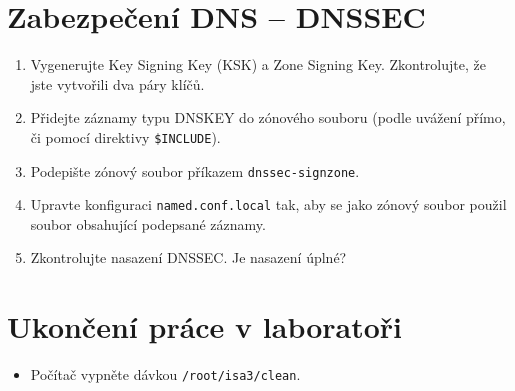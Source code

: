 \section{Zabezpečení DNS -- DNSSEC}

\begin{enumerate}

  \item Vygenerujte Key Signing Key (KSK) a Zone Signing Key. Zkontrolujte, že
    jste vytvořili dva páry klíčů.

  \item Přidejte záznamy typu DNSKEY do zónového souboru (podle uvážení přímo,
    či pomocí direktivy \verb|$INCLUDE|).

  \item Podepište zónový soubor příkazem \verb|dnssec-signzone|.

  \item Upravte konfiguraci {\tt named.conf.local} tak, aby se jako zónový
    soubor použil soubor obsahující podepsané záznamy.

  \item Zkontrolujte nasazení DNSSEC. Je nasazení úplné?

\end{enumerate}


\section{Ukončení práce v laboratoři}
\begin{itemize}
  \item Počítač vypněte dávkou {\tt /root/isa3/clean}.
\end{itemize}
